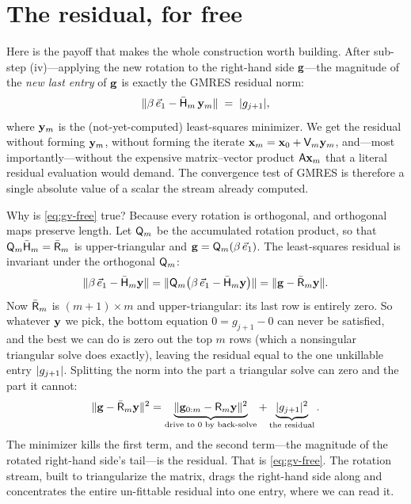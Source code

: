 \section{The residual, for free}
\label{sec:gv-residual}

Here is the payoff that makes the whole construction worth building. After sub-step
(iv)---applying the new rotation to the right-hand side $\mathbf{g}$---the magnitude of the
\emph{new last entry} of $\mathbf{g}$ is exactly the GMRES residual norm:
\begin{equation}
\label{eq:gv-free}
  \lVert\beta\,\vec e_1 - \bar{\mathsf{H}}_m\,\mathbf{y}_m\rVert
  \;=\; \lvert g_{j+1}\rvert,
\end{equation}
where $\mathbf{y}_m$ is the (not-yet-computed) least-squares minimizer. We get the residual
without forming $\mathbf{y}_m$, without forming the iterate $\mathbf{x}_m = \mathbf{x}_0 + \mathsf{V}_m\mathbf{y}_m$,
and---most importantly---without the expensive matrix--vector product $\mathsf{A}\mathbf{x}_m$ that
a literal residual evaluation would demand. The convergence test of GMRES is therefore a
single absolute value of a scalar the stream already computed.

Why is \cref{eq:gv-free} true? Because every rotation is orthogonal, and orthogonal maps
preserve length. Let $\mathsf{Q}_m$ be the accumulated rotation product, so that $\mathsf{Q}_m
\bar{\mathsf{H}}_m = \bar{\mathsf{R}}_m$ is upper-triangular and $\mathbf{g} = \mathsf{Q}_m(\beta\,\vec
e_1)$. The least-squares residual is invariant under the orthogonal $\mathsf{Q}_m$:
\begin{equation}
\label{eq:gv-residual-derivation}
  \lVert\beta\,\vec e_1 - \bar{\mathsf{H}}_m\mathbf{y}\rVert
  = \lVert\mathsf{Q}_m\!\left(\beta\,\vec e_1 - \bar{\mathsf{H}}_m\mathbf{y}\right)\rVert
  = \lVert\mathbf{g} - \bar{\mathsf{R}}_m\mathbf{y}\rVert.
\end{equation}
Now $\bar{\mathsf{R}}_m$ is $(m{+}1)\times m$ and upper-triangular: its last row is entirely
zero. So whatever $\mathbf{y}$ we pick, the bottom equation $0 = g_{j+1} - 0$ can never be
satisfied, and the best we can do is zero out the top $m$ rows (which a nonsingular
triangular solve does exactly), leaving the residual equal to the one unkillable
entry $\lvert g_{j+1}\rvert$. Splitting the norm into the part a triangular solve can zero and
the part it cannot:
\begin{equation}
\label{eq:gv-split}
  \lVert\mathbf{g} - \bar{\mathsf{R}}_m\mathbf{y}\rVert^2
  = \underbrace{\lVert\mathbf{g}_{0:m} - \mathsf{R}_m\mathbf{y}\rVert^2}_{\text{drive to }0\text{ by back-solve}}
  + \underbrace{\lvert g_{j+1}\rvert^2}_{\text{the residual}}.
\end{equation}
The minimizer kills the first term, and the second term---the magnitude of the rotated
right-hand side's tail---is the residual. That is \cref{eq:gv-free}. The rotation stream,
built to triangularize the matrix, drags the right-hand side along and concentrates the
entire un-fittable residual into one entry, where we can read it.

